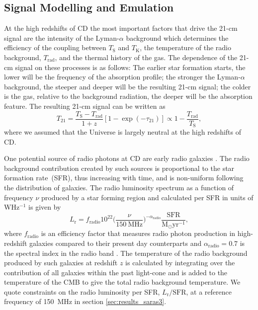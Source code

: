\subsection{Signal Modelling and Emulation}

At the high redshifts of CD the most important factors that drive the 21-cm signal are the intensity of the Lyman-$\alpha$ background which determines the efficiency of the coupling between $T_\mathrm{S}$ and $T_\mathrm{K}$, the temperature of the radio background, $T_\mathrm{rad}$, and the thermal history of the gas. The dependence of the 21-cm signal on these processes is as follows: The earlier star formation starts, the lower will be the frequency of the absorption profile; the stronger the Lyman-$\alpha$ background, the steeper and deeper will be the resulting 21-cm signal; the colder is the gas, relative to the background radiation, the deeper will be the absorption feature. The resulting 21-cm signal can be written as 
\begin{equation}    
T_{21} = \frac{T_\mathrm{S} - T_\mathrm{rad}}{1+z} \left[1 - \exp(-\tau_{21})\right] \propto 1-\frac{T_\mathrm{rad}}{T_\mathrm{S}},
    \label{eq:t21}
\end{equation}
where we assumed that the Universe is largely neutral at the high redshifts of CD.

One potential source of radio photons at CD are early radio galaxies \citep{MirochaRB2019}. The radio background contribution created by such sources is proportional to the star formation rate~(SFR), thus increasing with time,  and  is non-uniform following the distribution of galaxies. The radio luminosity spectrum as a function of frequency $\nu$ produced by a star forming region and calculated per SFR in units of WHz$^{-1}$ is given by 
\begin{equation}
    L_\mathrm{r} = f_\mathrm{radio} 10^{22} \bigg(\frac{\nu}{150~\mathrm{MHz}}\bigg)^{-\alpha_\mathrm{radio}} \frac{\mathrm{SFR}}{\mathrm{M}_\odot\mathrm{yr}^{-1}},
    \label{eq:radio_luminosity}
\end{equation}
where $f_\mathrm{radio}$ is an efficiency factor that measures radio photon production in high-redshift galaxies compared to their present day counterparts and $\alpha_\mathrm{radio}=0.7$ is the spectral index in the radio band \cite{Reis2020}. The temperature of the radio background produced by such galaxies at redshift $z$ is calculated by integrating over the contribution of all galaxies within the past light-cone \cite{Reis2020} and is added to the temperature of the CMB to give the total radio background temperature. 
We quote constraints on the radio luminosity per SFR, $L_\mathrm{r}/\mathrm{SFR}$, at a reference frequency of 150~MHz in section \ref{sec:results_saras3}.

